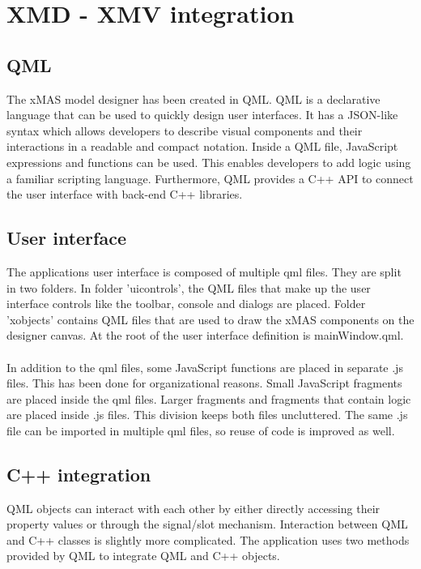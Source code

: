 \section{XMD - XMV integration}

\subsection{QML}

The xMAS model designer has been created in QML. QML is a declarative language
that can be used to quickly design user interfaces. It has a JSON-like syntax
which allows developers to describe visual components and their interactions
in a readable and compact notation. Inside a QML file, JavaScript expressions
and functions can be used. This enables developers to add logic using a familiar
scripting language. Furthermore, QML provides a C++ API to connect the user
interface with back-end C++ libraries.

\subsection{User interface}

The applications user interface is composed of multiple qml files. They are split
in two folders. In folder 'uicontrols', the QML files that make up the user interface
controls like the toolbar, console and dialogs are placed. Folder 'xobjects'
contains QML files that are used to draw the xMAS components on the designer
canvas. At the root of the user interface definition is mainWindow.qml.

\paragraph{}
In addition to the qml files, some JavaScript functions are placed in separate
.js files. This has been done for organizational reasons. Small JavaScript fragments
are placed inside the qml files. Larger fragments and fragments that contain logic
are placed inside .js files. This division keeps both files uncluttered. The same
.js file can be imported in multiple qml files, so reuse of code is improved as well.

\subsection{C++ integration}
QML objects can interact with each other by either directly accessing their property
values or through the signal/slot mechanism. Interaction between QML and C++
classes is slightly more complicated. The application uses two methods provided
by QML to integrate QML and C++ objects.

